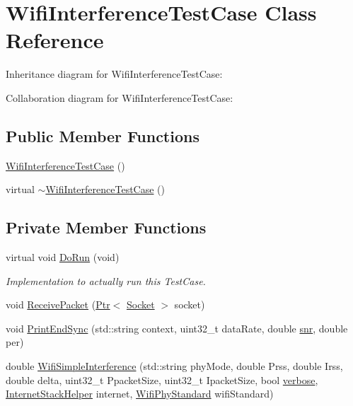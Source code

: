 \hypertarget{classWifiInterferenceTestCase}{}\section{Wifi\+Interference\+Test\+Case Class Reference}
\label{classWifiInterferenceTestCase}


Inheritance diagram for Wifi\+Interference\+Test\+Case\+:


Collaboration diagram for Wifi\+Interference\+Test\+Case\+:
\subsection*{Public Member Functions}
\begin{DoxyCompactItemize}
\item 
\hyperlink{classWifiInterferenceTestCase_a32833b4815338fdb5bb1999e1c62238c}{Wifi\+Interference\+Test\+Case} ()
\item 
virtual \hyperlink{classWifiInterferenceTestCase_a80882c69197c8f5a60d208434768c179}{$\sim$\+Wifi\+Interference\+Test\+Case} ()
\end{DoxyCompactItemize}
\subsection*{Private Member Functions}
\begin{DoxyCompactItemize}
\item 
virtual void \hyperlink{classWifiInterferenceTestCase_a1823c61fbe424309cf15e81ee03f398a}{Do\+Run} (void)
\begin{DoxyCompactList}\small\item\em Implementation to actually run this Test\+Case. \end{DoxyCompactList}\item 
void \hyperlink{classWifiInterferenceTestCase_a74caea35a68998ff6498ca882f00581b}{Receive\+Packet} (\hyperlink{classns3_1_1Ptr}{Ptr}$<$ \hyperlink{classns3_1_1Socket}{Socket} $>$ socket)
\item 
void \hyperlink{classWifiInterferenceTestCase_aa18e53673390dc3e3eb6e0f32b85f9ef}{Print\+End\+Sync} (std\+::string context, uint32\+\_\+t data\+Rate, double \hyperlink{lte__pathloss_8m_ae6e82a215dff6b79fb6e9952a1b78453}{snr}, double per)
\item 
double \hyperlink{classWifiInterferenceTestCase_a360c9c443551246707b58ee879c37a5a}{Wifi\+Simple\+Interference} (std\+::string phy\+Mode, double Prss, double Irss, double delta, uint32\+\_\+t Ppacket\+Size, uint32\+\_\+t Ipacket\+Size, bool \hyperlink{openflow-switch_8cc_ab3f078684998b83967d507d0f453f454}{verbose}, \hyperlink{classns3_1_1InternetStackHelper}{Internet\+Stack\+Helper} internet, \hyperlink{group__wifi_ga1299834f4e1c615af3ca738033b76a49}{Wifi\+Phy\+Standard} wifi\+Standard)
\end{DoxyCompactItemize}
